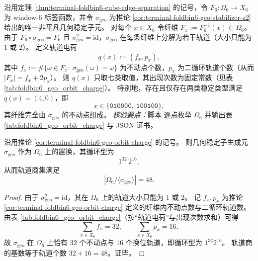 \begin{corollary}\label{cor:terminal-foldbin6-geo-orbit-charge}
沿用定理 \ref{thm:terminal-foldbin6-cube-edge-separation} 的记号，令 \(F_6:\Omega_6\to X_6\) 为 window-\(6\) 标签函数，并令 \(\sigma_{\mathrm{geo}}\) 为推论 \ref{cor:terminal-foldbin6-geo-stabilizer-z2} 给出的唯一非平凡几何稳定子元。
对每个 \(x\in X_6\) 令纤维 \(F_x:=F_6^{-1}(x)\subset\Omega_6\)。
由于 \(F_6\circ\sigma_{\mathrm{geo}}=F_6\) 且 \(\sigma_{\mathrm{geo}}^2=\mathrm{id}\)，\(\sigma_{\mathrm{geo}}\) 在每条纤维上分解为若干轨道（大小只能为 \(1\) 或 \(2\)）。
定义轨道电荷
\[
q(x):=(f_x,p_x),
\]
其中 \(f_x:=\#\{\omega\in F_x:\ \sigma_{\mathrm{geo}}(\omega)=\omega\}\) 为不动点个数，\(p_x\) 为二循环轨道个数（从而 \(|F_x|=f_x+2p_x\)）。
则 \(q(x)\) 只取七类取值，其出现次数为固定常数（见表 \ref{tab:foldbin6_geo_orbit_charge}）。
特别地，存在且仅存在两类稳定类型满足 \(q(x)=(4,0)\)，即
\[
x\in\{\texttt{010000},\ \texttt{100100}\},
\]
其纤维完全由 \(\sigma_{\mathrm{geo}}\) 的不动点组成。
\emph{核验要点：}脚本 \texttt{} 逐点枚举 \(\Omega_6\) 并输出表 \ref{tab:foldbin6_geo_orbit_charge} 与 JSON 证书。
\end{corollary}



\begin{corollary}\label{cor:terminal-foldbin6-geo-cycle-quotient-48}
沿用推论 \ref{cor:terminal-foldbin6-geo-orbit-charge} 的记号。
则几何稳定子生成元 \(\sigma_{\mathrm{geo}}\) 作为 \(\Omega_6\) 上的置换，其循环型为
\[
1^{32}\,2^{16},
\]
从而轨道商集满足
\[
|\Omega_6/\langle\sigma_{\mathrm{geo}}\rangle|=48.
\]
\end{corollary}
\begin{proof}
由于 \(\sigma_{\mathrm{geo}}^2=\mathrm{id}\)，其在 \(\Omega_6\) 上的轨道大小只能为 \(1\) 或 \(2\)。
记 \(f_x,p_x\) 为推论 \ref{cor:terminal-foldbin6-geo-orbit-charge} 定义的纤维内不动点数与二循环轨道数。
由表 \ref{tab:foldbin6_geo_orbit_charge}（按“轨道电荷”与出现次数求和）可得
\[
\sum_{x\in X_6} f_x=32,\qquad \sum_{x\in X_6} p_x=16,
\]
故 \(\sigma_{\mathrm{geo}}\) 在 \(\Omega_6\) 上恰有 \(32\) 个不动点与 \(16\) 个换位轨道，即循环型为 \(1^{32}2^{16}\)。
轨道商的基数等于轨道个数 \(32+16=48\)。证毕。
\end{proof}

